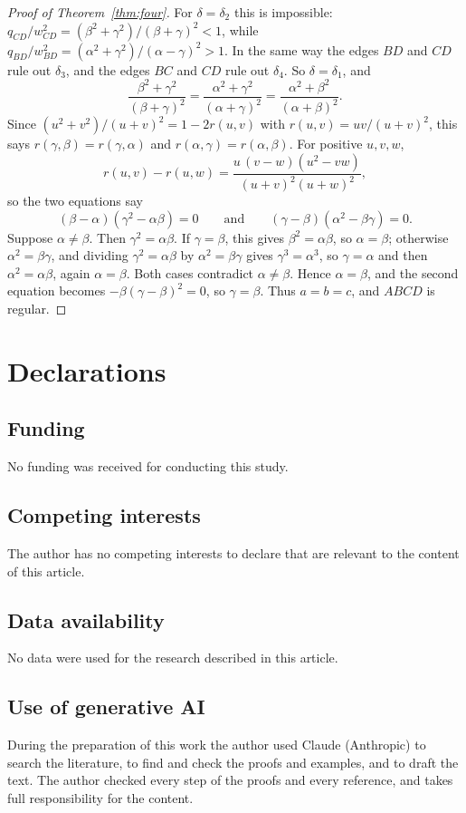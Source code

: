 \documentclass[11pt]{amsart}
\theoremstyle{definition}
\theoremstyle{remark}
\numberwithin{equation}{section}
\begin{document}
\begin{proof}[Proof of Theorem~\ref{thm:four}]
For $\delta=\delta_2$ this is impossible: $q_{CD}/w_{CD}^2=(\beta^2+\gamma^2)/(\beta+\gamma)^2<1$, while $q_{BD}/w_{BD}^2=(\alpha^2+\gamma^2)/(\alpha-\gamma)^2>1$. In the same way the edges $BD$ and $CD$ rule out $\delta_3$, and the edges $BC$ and $CD$ rule out $\delta_4$. So $\delta=\delta_1$, and
\[
\frac{\beta^2+\gamma^2}{(\beta+\gamma)^2}=\frac{\alpha^2+\gamma^2}{(\alpha+\gamma)^2}=\frac{\alpha^2+\beta^2}{(\alpha+\beta)^2}.
\]
Since $(u^2+v^2)/(u+v)^2=1-2r(u,v)$ with $r(u,v)=uv/(u+v)^2$, this says $r(\gamma,\beta)=r(\gamma,\alpha)$ and $r(\alpha,\gamma)=r(\alpha,\beta)$. For positive $u,v,w$,
\[
r(u,v)-r(u,w)=\frac{u\,(v-w)(u^2-vw)}{(u+v)^2(u+w)^2},
\]
so the two equations say
\[
(\beta-\alpha)(\gamma^2-\alpha\beta)=0\qquad\text{and}\qquad(\gamma-\beta)(\alpha^2-\beta\gamma)=0 .
\]
Suppose $\alpha\ne\beta$. Then $\gamma^2=\alpha\beta$. If $\gamma=\beta$, this gives $\beta^2=\alpha\beta$, so $\alpha=\beta$; otherwise $\alpha^2=\beta\gamma$, and dividing $\gamma^2=\alpha\beta$ by $\alpha^2=\beta\gamma$ gives $\gamma^3=\alpha^3$, so $\gamma=\alpha$ and then $\alpha^2=\alpha\beta$, again $\alpha=\beta$. Both cases contradict $\alpha\ne\beta$. Hence $\alpha=\beta$, and the second equation becomes $-\beta(\gamma-\beta)^2=0$, so $\gamma=\beta$. Thus $a=b=c$, and $ABCD$ is regular.
\end{proof}


\section*{Declarations}

\subsection*{Funding} No funding was received for conducting this study.

\subsection*{Competing interests} The author has no competing interests to declare that are relevant to the content of this article.

\subsection*{Data availability} No data were used for the research described in this article.

\subsection*{Use of generative AI} During the preparation of this work the author used Claude (Anthropic) to search the literature, to find and check the proofs and examples, and to draft the text. The author checked every step of the proofs and every reference, and takes full responsibility for the content.
\end{document}
